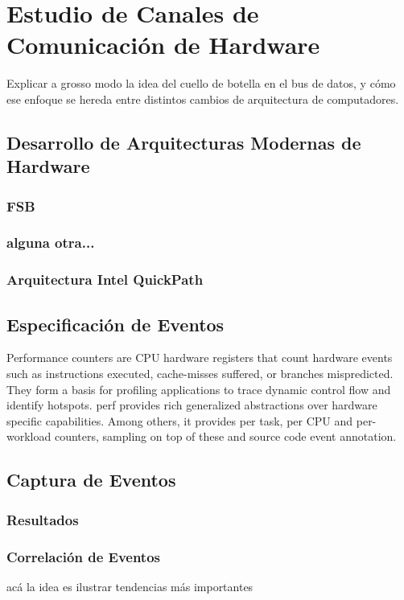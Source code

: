 \section{Estudio de Canales de Comunicación de Hardware}

Explicar a grosso modo la idea del cuello de botella en el bus de datos, y cómo ese enfoque se hereda entre distintos cambios de arquitectura de computadores.

\subsection{Desarrollo de Arquitecturas Modernas de Hardware}
\subsubsection{FSB}
\subsubsection{alguna otra...}
\subsubsection{Arquitectura Intel QuickPath}

\subsection{Especificación de Eventos}
Performance counters are CPU hardware registers that count hardware events such as instructions executed, cache-misses suffered, or branches mispredicted. They form a basis for profiling applications to trace dynamic control flow and identify hotspots. perf provides rich generalized abstractions over hardware specific capabilities. Among others, it provides per task, per CPU and per-workload counters, sampling on top of these and source code event annotation.

\subsection{Captura de Eventos}
\subsubsection{Resultados}
\subsubsection{Correlación de Eventos}
acá la idea es ilustrar tendencias más importantes
